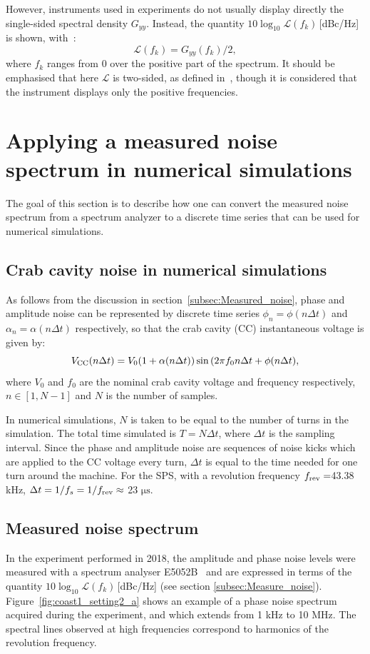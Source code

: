However, instruments used in experiments do not usually display directly the single-sided spectral density $G_{yy}$. Instead, the quantity $10\log_{10}\mathcal{L}(f_k)$\,[dBc/Hz] is shown, with~\cite{IEEE:4797525}:
\begin{equation}\label{eq:L_to_G}
    \mathcal{L}(f_k) = G_{yy}(f_k)/2,
\end{equation}
where $f_k$ ranges from 0 over the positive part of the spectrum. It should be emphasised that here $\mathcal{L}$ is two-sided, as defined in~\cite{IEEE:4797525}, though it is considered that the instrument displays only the positive frequencies.

\section{Applying a measured noise spectrum in numerical simulations}\label{sec:measured_spectra_to_time_series}
The goal of this section is to describe how one can convert the measured noise spectrum from a spectrum analyzer to a discrete time series that can be used for numerical simulations. 
\subsection{Crab cavity noise in numerical simulations}
As follows from the discussion in section~\ref{subsec:Measured_noise}, phase and amplitude noise can be represented by discrete time series $\phi_n = \phi(n\Delta t)$ and  $\alpha_n = \alpha(n\Delta t)$ respectively, so that the crab cavity (CC) instantaneous voltage is given by:
\begin{equation}\label{eq:CC_PN_AN}
    {V_\mathrm{CC}} (n \Delta t) =  V_0(1+\alpha(n \Delta t)) \sin{(2\pi f_0 n \Delta t + \phi(n \Delta t)},
\end{equation}
where $V_0$ and $f_0$ are the nominal crab cavity voltage and frequency respectively, $n \in \left [1, N-1 \right ]$ and $N$ is the number of samples.

In numerical simulations, $N$ is taken to be equal to the number of turns in the simulation. The total time simulated is $T=N \Delta t$, where $\Delta t$ is the sampling interval. Since the phase and amplitude noise are sequences of noise kicks which are applied to the CC voltage every turn, $\Delta t$ is equal to the time needed for one turn around the machine. For the SPS, with a revolution frequency ${f_\mathrm{rev}} = $43.38 kHz, $\Delta t=1/f_s = 1/{f_\mathrm{rev}} \approx$ 23 $\mathrm{\mu s}$. 
\subsection{Measured noise spectrum}
In the experiment performed in 2018, the amplitude and phase noise levels were measured with a spectrum analyser E5052B~\cite{E5052B_insight} and are expressed in terms of the quantity $10\log_{10}\mathcal{L}(f_k)$\,[dBc/Hz] (see section \ref{subsec:Measure_noise}). Figure~\ref{fig:coast1_setting2_a} shows an example of a phase noise spectrum acquired during the experiment, and which extends from 1 kHz to 10 MHz. The spectral lines observed at high frequencies correspond to harmonics of the revolution frequency. 

